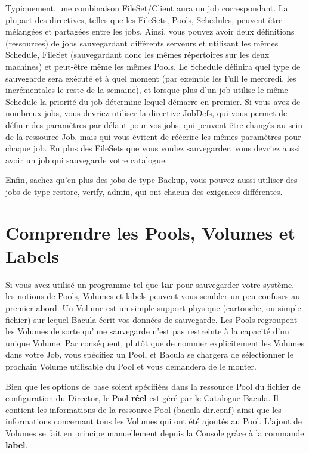 Typiquement, une combinaison FileSet/Client aura un job correspondant. La plupart 
des directives, telles que les FileSets, Pools, Schedules, peuvent \^etre 
m\'elang\'ees et partag\'ees entre les jobs. Ainsi, vous pouvez avoir deux d\'efinitions 
(ressources) de jobs sauvegardant diff\'erents serveurs et utilisant les m\^emes 
Schedule, FileSet (sauvegardant donc les m\^emes r\'epertoires sur les deux 
machines) et peut-\^etre m\^eme les m\^emes Pools. Le Schedule d\'efinira quel 
type de sauvegarde sera ex\'ecut\'e et \`a quel moment (par exemple les Full le 
mercredi, les incr\'ementales le reste de la semaine), et lorsque plus d'un job 
utilise le m\^eme Schedule la priorit\'e du job d\'etermine lequel d\'emarre en premier. 
Si vous avez de nombreux jobs, vous devriez utiliser la directive JobDefs, 
qui vous permet de d\'efinir des param\`etres par d\'efaut pour vos jobs, qui peuvent \^etre 
chang\'es au sein de la ressource Job, mais qui vous \'evitent de r\'e\'ecrire les m\^emes 
param\`etres pour chaque job. En plus des FileSets que vous voulez sauvegarder, 
vous devriez aussi avoir un job qui sauvegarde votre catalogue.

Enfin, sachez qu'en plus des jobs de type Backup, vous pouvez aussi utiliser 
des jobs de type restore, verify, admin, qui ont chacun des exigences 
diff\'erentes.

\label{PoolsVolsLabels}

\section{Comprendre les Pools, Volumes et Labels}

Si vous avez utilis\'e un programme tel que {\bf tar} pour sauvegarder votre
syst\`eme, les notions de Pools, Volumes et labels peuvent vous sembler un peu
confuses au premier abord. Un Volume est un simple support physique
(cartouche, ou simple fichier) sur lequel Bacula \'ecrit vos donn\'ees de
sauvegarde. Les Pools regroupent les Volumes de sorte qu'une sauvegarde n'est
pas restreinte \`a la capacit\'e d'un unique Volume. Par cons\'equent,
plut\^ot que de nommer explicitement les Volumes dans votre Job, vous
sp\'ecifiez un Pool, et Bacula se chargera de s\'electionner le prochain
Volume utilisable du Pool et vous demandera de le monter. 

Bien que les options de base soient sp\'ecifi\'ees dans la ressource Pool du
fichier de configuration du Director, le Pool {\bf r\'eel} est g\'er\'e par le
Catalogue Bacula. Il contient les informations de la ressource Pool
(bacula-dir.conf) ainsi que les informations concernant tous les Volumes qui
ont \'et\'e ajout\'es au Pool. L'ajout de Volumes se fait en principe
manuellement depuis la Console gr\^ace \`a la commande {\bf label}. 

